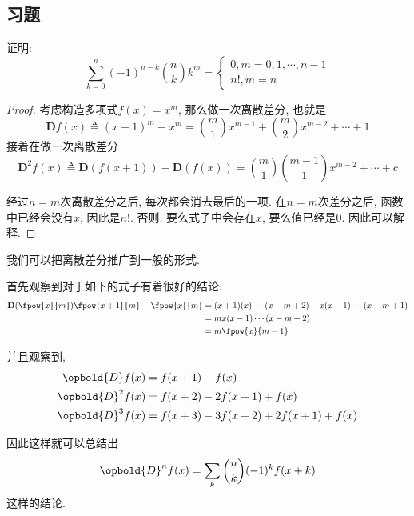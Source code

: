 \subsection{习题}

\begin{prob}%
    证明:
    $$
    \sum_{k=0}^n(-1)^{n-k}{n\choose k}k^m=\begin{cases}
        0, m=0,1,\cdots, n-1\\
        n!, m=n
    \end{cases}
    $$
\end{prob}

\begin{proof}
    考虑构造多项式$f(x)=x^m$, 那么做一次离散差分, 也就是
    $$
    \textbf{D}f(x) \triangleq (x+1)^{m}-x^m = {m\choose 1}x^{m-1}+{m\choose 2}x^{m-2}+\cdots+1
    $$ 
    接着在做一次离散差分
    $$
    \textbf{D}^2 f(x) \triangleq \textbf{D}(f(x+1))-\textbf{D}(f(x)) = {m\choose 1}{m-1\choose 1}x^{m-2}+\cdots+c
    $$

    经过$n=m$次离散差分之后, 每次都会消去最后的一项. 在$n=m$次差分之后, 函数中已经会没有$x$, 因此是$n!$. 否则, 要么式子中会存在$x$, 要么值已经是0. 因此可以解释. 

    
\end{proof}

\begin{remark}
    我们可以把离散差分推广到一般的形式. 

    首先观察到对于如下的式子有着很好的结论:
    $$
    \begin{aligned}
        \textbf{D}(\fpow{x}{m})\fpow{x+1}{m}-\fpow{x}{m}
        &= (x+1)(x)\cdots (x-m+2) - x(x-1)\cdots (x-m+1)\\ 
        &= mx(x-1)\cdots(x-m+2) \\
        &= m\fpow{x}{m-1}
    \end{aligned}
    $$

    并且观察到, 
    $$
    \begin{aligned}
        \opbold{D} f(x)&=f(x+1)-f(x) \\ 
        \opbold{D}^2 f(x)&=f(x+2)-2f(x+1)+f(x)\\ 
        \opbold{D}^3 f(x)&=f(x+3)-3f(x+2)+2f(x+1)+f(x) 
    \end{aligned}
    $$

    因此这样就可以总结出
    $$
    \opbold{D}^n f(x)=\sum_{k} {n\choose k} (-1)^k f(x+k)
    $$
    这样的结论. 
\end{remark}

